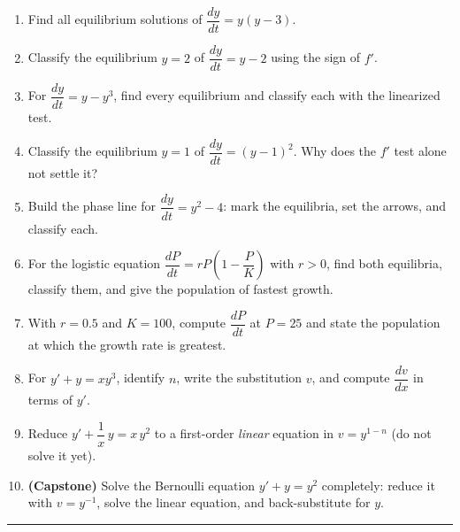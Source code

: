 \begin{enumerate}[leftmargin=2em]
    \item Find all equilibrium solutions of $\dfrac{dy}{dt} = y(y-3)$.

    \item Classify the equilibrium $y = 2$ of $\dfrac{dy}{dt} = y - 2$ using the
          sign of $f'$.

    \item For $\dfrac{dy}{dt} = y - y^{3}$, find every equilibrium and classify
          each with the linearized test.

    \item Classify the equilibrium $y = 1$ of $\dfrac{dy}{dt} = (y-1)^{2}$. Why
          does the $f'$ test alone not settle it?

    \item Build the phase line for $\dfrac{dy}{dt} = y^{2} - 4$: mark the
          equilibria, set the arrows, and classify each.

    \item For the logistic equation $\dfrac{dP}{dt} = rP\!\left(1-\dfrac{P}{K}\right)$
          with $r > 0$, find both equilibria, classify them, and give the
          population of fastest growth.

    \item With $r = 0.5$ and $K = 100$, compute $\dfrac{dP}{dt}$ at $P = 25$ and
          state the population at which the growth rate is greatest.

    \item For $y' + y = xy^{3}$, identify $n$, write the substitution $v$, and
          compute $\dfrac{dv}{dx}$ in terms of $y'$.

    \item Reduce $y' + \dfrac{1}{x}\,y = x\,y^{2}$ to a first-order \emph{linear}
          equation in $v = y^{1-n}$ (do not solve it yet).

    \item \textbf{(Capstone)} Solve the Bernoulli equation $y' + y = y^{2}$
          completely: reduce it with $v = y^{-1}$, solve the linear equation, and
          back-substitute for $y$.
\end{enumerate}

\vspace{0.4em}
\hrule
\vspace{0.6em}

\clearpage
{}
{}
